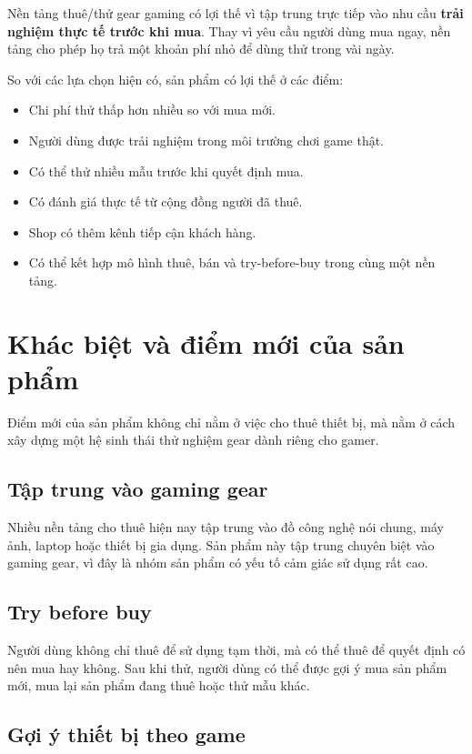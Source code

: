 Nền tảng thuê/thử gear gaming có lợi thế vì tập trung trực tiếp vào nhu cầu \textbf{trải nghiệm thực tế trước khi mua}. Thay vì yêu cầu người dùng mua ngay, nền tảng cho phép họ trả một khoản phí nhỏ để dùng thử trong vài ngày.

So với các lựa chọn hiện có, sản phẩm có lợi thế ở các điểm:

\begin{itemize}
    \item Chi phí thử thấp hơn nhiều so với mua mới.
    \item Người dùng được trải nghiệm trong môi trường chơi game thật.
    \item Có thể thử nhiều mẫu trước khi quyết định mua.
    \item Có đánh giá thực tế từ cộng đồng người đã thuê.
    \item Shop có thêm kênh tiếp cận khách hàng.
    \item Có thể kết hợp mô hình thuê, bán và try-before-buy trong cùng một nền tảng.
\end{itemize}

\section{Khác biệt và điểm mới của sản phẩm}

Điểm mới của sản phẩm không chỉ nằm ở việc cho thuê thiết bị, mà nằm ở cách xây dựng một hệ sinh thái thử nghiệm gear dành riêng cho gamer.

\subsection{Tập trung vào gaming gear}

Nhiều nền tảng cho thuê hiện nay tập trung vào đồ công nghệ nói chung, máy ảnh, laptop hoặc thiết bị gia dụng. Sản phẩm này tập trung chuyên biệt vào gaming gear, vì đây là nhóm sản phẩm có yếu tố cảm giác sử dụng rất cao.

\subsection{Try before buy}

Người dùng không chỉ thuê để sử dụng tạm thời, mà có thể thuê để quyết định có nên mua hay không. Sau khi thử, người dùng có thể được gợi ý mua sản phẩm mới, mua lại sản phẩm đang thuê hoặc thử mẫu khác.

\subsection{Gợi ý thiết bị theo game}

